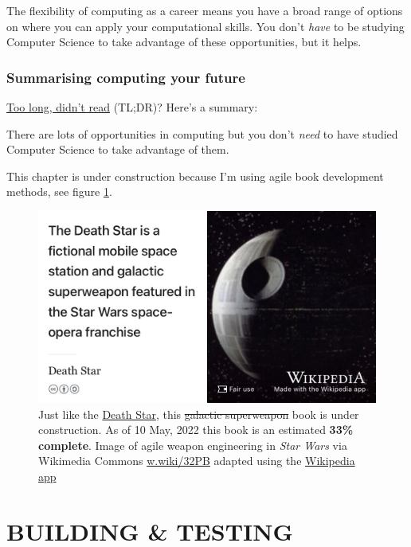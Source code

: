 \documentclass[
]{book}
\begin{document}
The flexibility of computing as a career means you have a broad range of options on where you can apply your computational skills. You don't \emph{have} to be studying Computer Science to take advantage of these opportunities, but it helps.

\hypertarget{tldr6}{%
\section{Summarising computing your future}\label{tldr6}}

\href{https://en.wiktionary.org/wiki/too_long;_didn\%27t_read}{Too long, didn't read} (TL;DR)? Here's a summary:

There are lots of opportunities in computing but you don't \emph{need} to have studied Computer Science to take advantage of them.

This chapter is under construction because I'm using agile book development methods, see figure \ref{fig:deathstar3-fig}.

\begin{figure}

{\centering \includegraphics[width=0.99\linewidth]{images/DeathStar2} 

}

\caption{Just like the \href{https://en.wikipedia.org/wiki/Death_Star}{Death Star}, this \sout{galactic superweapon} book is under construction. As of 10 May, 2022 this book is an estimated \textbf{33\% complete}. Image of agile weapon engineering in \emph{Star Wars} via Wikimedia Commons \href{https://w.wiki/32PB}{w.wiki/32PB} adapted using the \href{https://apps.apple.com/gb/app/wikipedia/id324715238}{Wikipedia app}}\label{fig:deathstar3-fig}
\end{figure}

\hypertarget{part-building-testing}{%
\part{BUILDING \& TESTING}\label{part-building-testing}}
\end{document}

